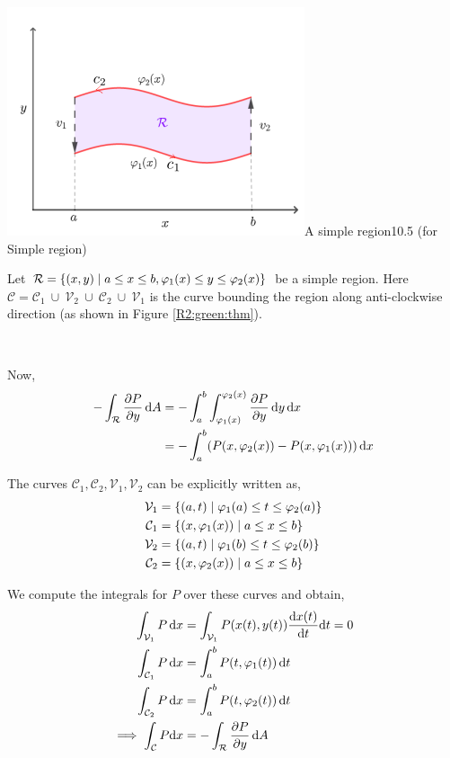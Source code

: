 \documentclass[../Analysis-3.tex]{subfiles}
\begin{document}
\begin{proofFig}{\includegraphics[width=.78\linewidth]{../figures/lec-28.1.png}}{A simple region}{\label{R2:green:thm}}{10}{.5\textwidth} (for Simple region)

  Let $\mathcal{R} = \qty{(x,y) \mid a\leq x\leq b, \varphi_1(x) \leq y \leq \varphi_2(x)}$ be a simple region. Here $\mathcal{C} = \mathcal{C}_1 \ \cup \ \mathcal{V}_2 \ \cup \ \mathcal{C}_2 \ \cup \ \mathcal{V}_1$ is the curve bounding the region along anti-clockwise direction (as shown in Figure \ref{R2:green:thm}).

  \

  Now,
  \begin{align*}
    -\int_{\mathcal{R}} \pdv{P}{y} \, \dd A
     & = -\int_{a}^{b} \int_{\varphi_1(x)}^{\varphi_2(x)} \pdv{P}{y} \, \dd y \, \dd x \\
     & = - \int_{a}^{b} (P(x,\varphi_2(x))-P(x,\varphi_1(x))) \, \dd x                 \\
  \end{align*}

  The curves $\mathcal{C}_1,\mathcal{C}_2,\mathcal{V}_1,\mathcal{V}_2$ can be explicitly written as,
  \begin{align*}
    \mathcal{V}_1 & = \qty{(a,t) \mid \varphi_1(a) \leq t \leq \varphi_2(a)} \\
    \mathcal{C}_1 & = \qty{(x,\varphi_1(x)) \mid a \leq x \leq b}            \\
    \mathcal{V}_2 & = \qty{(a,t)\mid \varphi_1(b) \leq t \leq \varphi_2(b)}  \\
    \mathcal{C}_2 & = \qty{(x,\varphi_2(x)) \mid a \leq x \leq b}
  \end{align*}

  We compute the integrals for $ P $ over these curves and obtain,
  \begin{align*}
    \int_{\mathcal{V}_1} P \, \dd x    & = \int_{\mathcal{V}_1} P(x(t),y(t)) \dv{x(t)}{t} \dd t = 0 \\
    \int_{\mathcal{C}_1} P \, \dd x    & = \int_{a}^{b} P(t,\varphi_1(t)) \, \dd t                  \\
    \int_{\mathcal{C}_2} P \, \dd x    & = \int_{a}^{b} P(t,\varphi_2(t)) \, \dd t                  \\
    \implies \int_{\mathcal{C}} P\dd x & = -\int_{\mathcal{R}} \pdv{P}{y} \, \dd A
  \end{align*}


\end{proofFig}
\end{document}
